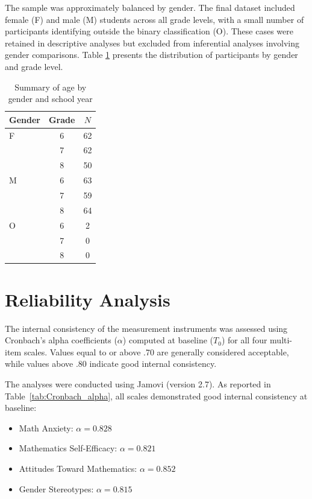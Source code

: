 The sample was approximately balanced by gender. The final dataset included female (F) and male (M) students across all grade levels, with a small number of participants identifying outside the binary classification (O). These cases were retained in descriptive analyses but excluded from inferential analyses involving gender comparisons.
Table \ref{tab:age_gender} presents the distribution of participants by gender and grade level.

\begin{table}[H]
  \centering
  \caption{Summary of age by gender and school year}
  \vspace{0.3cm}
  \label{tab:age_gender}
  \begin{tabular}{lcc}
    \toprule
    Gender & Grade & $N$ \\
    \midrule
    F & 6 & 62 \\
      & 7 & 62 \\
      & 8 & 50 \\
    \addlinespace
    M & 6 & 63 \\
      & 7 & 59 \\
      & 8 & 64 \\
    \addlinespace
    O & 6 & 2 \\
      & 7 & 0 \\
      & 8 & 0 \\
    \bottomrule
  \end{tabular}
\end{table}

\section{Reliability Analysis}
The internal consistency of the measurement instruments was assessed using Cronbach's alpha coefficients ($\alpha$) computed at baseline ($T_0$) for all four multi-item scales.
Values equal to or above .70 are generally considered acceptable, while values above .80 indicate good internal consistency.

The analyses were conducted using Jamovi (version 2.7).
As reported in Table~\ref{tab:Cronbach_alpha}, all scales demonstrated good internal consistency at baseline:
\begin{itemize}
  \item Math Anxiety: $\alpha = 0.828$
  \item Mathematics Self-Efficacy: $\alpha = 0.821$
  \item Attitudes Toward Mathematics: $\alpha = 0.852$
  \item Gender Stereotypes: $\alpha = 0.815$
\end{itemize}

